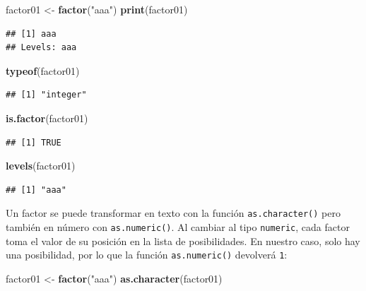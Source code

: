 \documentclass[]{book}
\newenvironment{Shaded}{\begin{snugshade}}{\end{snugshade}}
\newcommand{\KeywordTok}[1]{\textcolor[rgb]{0.13,0.29,0.53}{\textbf{#1}}}
\newcommand{\StringTok}[1]{\textcolor[rgb]{0.31,0.60,0.02}{#1}}
\newcommand{\NormalTok}[1]{#1}
\begin{document}
\begin{Shaded}
\begin{Highlighting}[]
\NormalTok{factor01 <-}\StringTok{ }\KeywordTok{factor}\NormalTok{(}\StringTok{"aaa"}\NormalTok{)}
\KeywordTok{print}\NormalTok{(factor01)}
\end{Highlighting}
\end{Shaded}

\begin{verbatim}
## [1] aaa
## Levels: aaa
\end{verbatim}

\begin{Shaded}
\begin{Highlighting}[]
\KeywordTok{typeof}\NormalTok{(factor01)}
\end{Highlighting}
\end{Shaded}

\begin{verbatim}
## [1] "integer"
\end{verbatim}

\begin{Shaded}
\begin{Highlighting}[]
\KeywordTok{is.factor}\NormalTok{(factor01)}
\end{Highlighting}
\end{Shaded}

\begin{verbatim}
## [1] TRUE
\end{verbatim}

\begin{Shaded}
\begin{Highlighting}[]
\KeywordTok{levels}\NormalTok{(factor01)}
\end{Highlighting}
\end{Shaded}

\begin{verbatim}
## [1] "aaa"
\end{verbatim}

Un factor se puede transformar en texto con la función
\texttt{as.character()} pero también en número con
\texttt{as.numeric()}. Al cambiar al tipo \texttt{numeric}, cada factor
toma el valor de su posición en la lista de posibilidades. En nuestro
caso, solo hay una posibilidad, por lo que la función
\texttt{as.numeric()} devolverá \texttt{1}:

\begin{Shaded}
\begin{Highlighting}[]
\NormalTok{factor01 <-}\StringTok{ }\KeywordTok{factor}\NormalTok{(}\StringTok{"aaa"}\NormalTok{)}
\KeywordTok{as.character}\NormalTok{(factor01)}
\end{Highlighting}
\end{Shaded}
\end{document}
